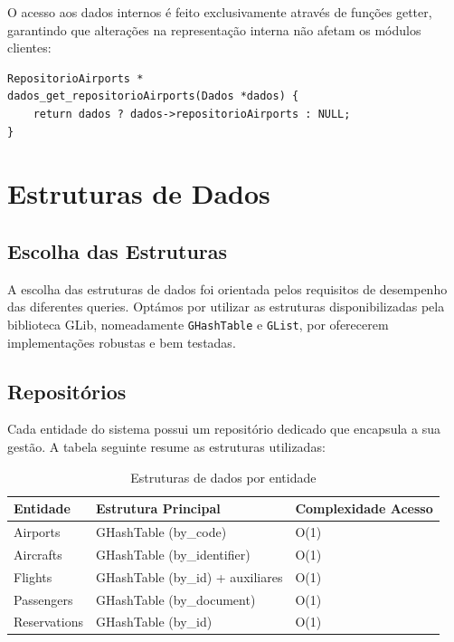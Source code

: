 \documentclass[a4paper,12pt]{scrreprt}
\begin{document}
O acesso aos dados internos é feito exclusivamente através de funções getter, garantindo que alterações na representação interna não afetam os módulos clientes:

\begin{lstlisting}[caption={Exemplo de getter}]
RepositorioAirports *
dados_get_repositorioAirports(Dados *dados) {
    return dados ? dados->repositorioAirports : NULL;
}
\end{lstlisting}

\chapter{Estruturas de Dados}

\section{Escolha das Estruturas}

A escolha das estruturas de dados foi orientada pelos requisitos de desempenho das diferentes queries. Optámos por utilizar as estruturas disponibilizadas pela biblioteca GLib, nomeadamente \texttt{GHashTable} e \texttt{GList}, por oferecerem implementações robustas e bem testadas.

\section{Repositórios}

Cada entidade do sistema possui um repositório dedicado que encapsula a sua gestão. A tabela seguinte resume as estruturas utilizadas:

\begin{table}[H]
\centering
\begin{tabular}{|l|l|l|}
\hline
\textbf{Entidade} & \textbf{Estrutura Principal} & \textbf{Complexidade Acesso} \\
\hline
Airports & GHashTable (by\_code) & O(1) \\
\hline
Aircrafts & GHashTable (by\_identifier) & O(1) \\
\hline
Flights & GHashTable (by\_id) + auxiliares & O(1) \\
\hline
Passengers & GHashTable (by\_document) & O(1) \\
\hline
Reservations & GHashTable (by\_id) & O(1) \\
\hline
\end{tabular}
\caption{Estruturas de dados por entidade}
\end{table}
\end{document}
